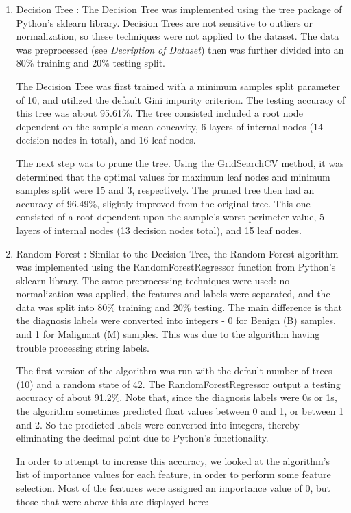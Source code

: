 \documentclass[conference]{IEEEtran}
\begin{document}
\begin{enumerate}
     \item Decision Tree : The Decision Tree was implemented using the tree package of Python's sklearn library. Decision Trees are not sensitive to outliers or normalization, so these techniques were not applied to the dataset. The data was preprocessed (see {\em Decription of Dataset})  then was further divided into an 80\% training and 20\% testing split.
     
     The Decision Tree was first trained with a minimum samples split parameter of 10, and utilized the default Gini impurity criterion. The testing accuracy of this tree was about 95.61\%. The tree consisted included a root node dependent on the sample's mean concavity, 6 layers of internal nodes (14 decision nodes in total), and 16 leaf nodes.
    
     The next step was to prune the tree. Using the GridSearchCV method, it was determined that the optimal values for maximum leaf nodes and minimum samples split were 15 and 3, respectively. The pruned tree then had an accuracy of 96.49\%, slightly improved from the original tree. This one consisted of a root dependent upon the sample's worst perimeter value, 5 layers of internal nodes (13 decision nodes total), and 15 leaf nodes.

    \item Random Forest : Similar to the Decision Tree, the Random Forest algorithm was implemented using the RandomForestRegressor function from Python's sklearn library. The same preprocessing techniques were used: no normalization was applied, the features and labels were separated, and the data was split into 80\% training and 20\% testing. The main difference is that the diagnosis labels were converted into integers - 0 for Benign (B) samples, and 1 for Malignant (M) samples. This was due to the algorithm having trouble processing string labels.

    The first version of the algorithm was run with the default number of trees (10) and a random state of 42. The RandomForestRegressor output a testing accuracy of about 91.2\%. Note that, since the diagnosis labels were 0s or 1s, the algorithm sometimes predicted float values between 0 and 1, or between 1 and 2. So the predicted labels were converted into integers, thereby eliminating the decimal point due to Python's functionality. 

    In order to attempt to increase this accuracy, we looked at the algorithm's list of importance values for each feature, in order to perform some feature selection. Most of the features were assigned an importance value of 0, but those that were above this are displayed here:


\end{enumerate}
\end{document}
